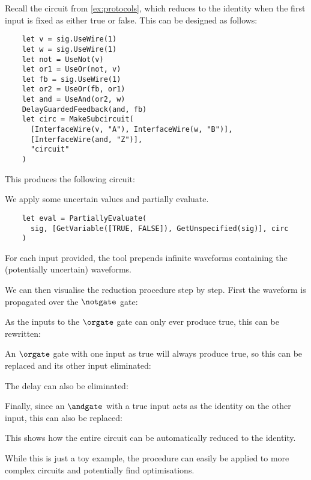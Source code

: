 \begin{example}
  Recall the circuit from \cref{ex:protocols}, which reduces to the identity
  when the first input is fixed as either true or false.
  This can be designed as follows:
  \begin{lstlisting}
    let v = sig.UseWire(1)
    let w = sig.UseWire(1)
    let not = UseNot(v)
    let or1 = UseOr(not, v)
    let fb = sig.UseWire(1)
    let or2 = UseOr(fb, or1)
    let and = UseAnd(or2, w)
    DelayGuardedFeedback(and, fb)
    let circ = MakeSubcircuit(
      [InterfaceWire(v, "A"), InterfaceWire(w, "B")],
      [InterfaceWire(and, "Z")],
      "circuit"
    )
  \end{lstlisting}
  This produces the following circuit:
  \begin{center}
    
  \end{center}
  We apply some uncertain values and partially evaluate.
  \begin{lstlisting}
    let eval = PartiallyEvaluate(
      sig, [GetVariable([TRUE, FALSE]), GetUnspecified(sig)], circ
    )
  \end{lstlisting}
  For each input provided, the tool prepends infinite waveforms containing the
  (potentially uncertain) waveforms.
  \begin{center}
    
  \end{center}
  We can then visualise the reduction procedure step by step. First the
  waveform is propagated over the \(\notgate\) gate:
  \begin{center}
    
  \end{center}
  As the inputs to the \(\orgate\) gate can only ever produce true, this can be
  rewritten:
  \begin{center}
    
  \end{center}
  An \(\orgate\) gate with one input as true will always produce true, so this
  can be replaced and its other input eliminated:
  \begin{center}
    
  \end{center}
  The delay can also be eliminated:
  \begin{center}
    
  \end{center}
  Finally, since an \(\andgate\) with a true input acts as the identity on the
  other input, this can also be replaced:
  \begin{center}
    
  \end{center}
  This shows how the entire circuit can be automatically reduced to the
  identity.
\end{example}

While this is just a toy example, the procedure can easily be applied to more
complex circuits and potentially find optimisations.